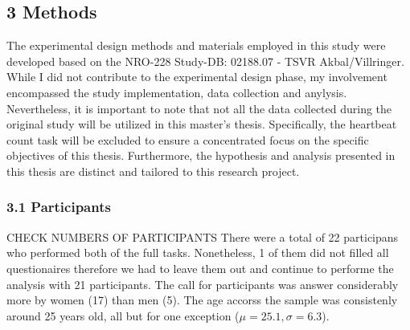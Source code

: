 \documentclass[12pt,oneside,openright]{report}
\begin{document}
\subsection*{3 Methods}
The experimental design methods and materials employed in this study were developed based on the NRO-228 Study-DB: 02188.07 - TSVR Akbal/Villringer. While I did not contribute to the experimental design phase, my involvement encompassed the study implementation, data collection and anylysis. Nevertheless, it is important to note that not all the data collected during the original study will be utilized in this master's thesis. Specifically, the heartbeat count task will be excluded to ensure a concentrated focus on the specific objectives of this thesis. Furthermore, the hypothesis and analysis presented in this thesis are distinct and tailored to this research project.

\subsubsection*{3.1 Participants}
CHECK NUMBERS OF PARTICIPANTS There were a total of 22 participans who performed both of the full tasks. Nonetheless, 1 of them did not filled all questionaires therefore we had to leave them out and continue to performe the analysis with 21 participants. The call for participants was answer considerably more by women (17) than men (5). The age accorss the sample was consistenly around 25 years old, all but for one exception ($\mu=25.1 , \sigma=6.3$).
\end{document}
